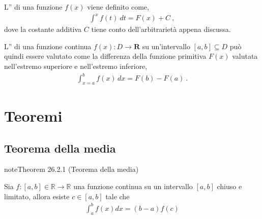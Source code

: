 \documentclass[letterpaper,10pt,italian]{jupyterBook}
\begin{document}
\sphinxAtStartPar
L” di una funzione \(f(x)\) viene definito come,
\begin{equation*}
\begin{split}\int^x f(t) \ dt = F(x) + C \ ,\end{split}
\end{equation*}
\sphinxAtStartPar
dove la costante additiva \(C\) tiene conto dell’arbitrarietà appena discussa.

\sphinxAtStartPar
L” di una funzione continua \(f(x): D \rightarrow \mathbf{R}\) su un’intervallo \([a,b] \subseteq D\) può quindi essere valutato come la differenza della funzione primitiva \(F(x)\) valutata nell’estremo superiore e nell’estremo inferiore,
\begin{equation*}
\begin{split}\int_{x=a}^{b} f(x) \, dx = F(b) - F(a) \ .\end{split}
\end{equation*}

\section{Teoremi}
\label{\detokenize{ch/infinitesimal_calculus/integrals:teoremi}}\label{\detokenize{ch/infinitesimal_calculus/integrals:infinitesimal-calculus-integrals-thm}}



\subsection{Teorema della media}
\label{\detokenize{ch/infinitesimal_calculus/integrals:teorema-della-media}}\label{\detokenize{ch/infinitesimal_calculus/integrals:infinitesimal-calculus-integrals-thm-avg}}\label{ch/infinitesimal_calculus/integrals:integrals:thm:avg}
\begin{sphinxadmonition}{note}{Theorem 26.2.1 (Teorema della media)}



\sphinxAtStartPar
Sia \(f: [a,b] \in \mathbb{R} \rightarrow \mathbb{R}\) una funzione continua su un intervallo \([a,b]\) chiuso e limitato, allora esiste \(c \in [a,b]\) tale che
\begin{equation*}
\begin{split}\int_{a}^{b} f(x) dx = (b-a) f(c) \end{split}
\end{equation*}\end{sphinxadmonition}
\end{document}
